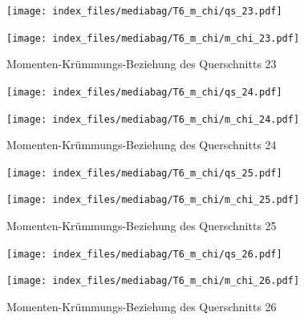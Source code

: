 \documentclass[
  11pt,
  letterpaper,
]{scrreprt}
\begin{document}
\begin{figure}[H]

\begin{minipage}{0.50\linewidth}
\texttt{[image: index\_files/mediabag/T6\_m\_chi/qs\_23.pdf]}\end{minipage}%
%
\begin{minipage}{0.50\linewidth}
\texttt{[image: index\_files/mediabag/T6\_m\_chi/m\_chi\_23.pdf]}\end{minipage}%

\caption{\label{fig-mchi_anhang}Momenten-Krümmungs-Beziehung des
Querschnitts 23}

\end{figure}%

\begin{figure}[H]

\begin{minipage}{0.50\linewidth}
\texttt{[image: index\_files/mediabag/T6\_m\_chi/qs\_24.pdf]}\end{minipage}%
%
\begin{minipage}{0.50\linewidth}
\texttt{[image: index\_files/mediabag/T6\_m\_chi/m\_chi\_24.pdf]}\end{minipage}%

\caption{\label{fig-mchi_anhang}Momenten-Krümmungs-Beziehung des
Querschnitts 24}

\end{figure}%

\begin{figure}[H]

\begin{minipage}{0.50\linewidth}
\texttt{[image: index\_files/mediabag/T6\_m\_chi/qs\_25.pdf]}\end{minipage}%
%
\begin{minipage}{0.50\linewidth}
\texttt{[image: index\_files/mediabag/T6\_m\_chi/m\_chi\_25.pdf]}\end{minipage}%

\caption{\label{fig-mchi_anhang}Momenten-Krümmungs-Beziehung des
Querschnitts 25}

\end{figure}%

\begin{figure}[H]

\begin{minipage}{0.50\linewidth}
\texttt{[image: index\_files/mediabag/T6\_m\_chi/qs\_26.pdf]}\end{minipage}%
%
\begin{minipage}{0.50\linewidth}
\texttt{[image: index\_files/mediabag/T6\_m\_chi/m\_chi\_26.pdf]}\end{minipage}%

\caption{\label{fig-mchi_anhang}Momenten-Krümmungs-Beziehung des
Querschnitts 26}

\end{figure}%
\end{document}

